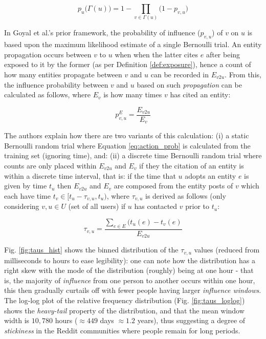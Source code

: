 \documentclass[journal,10pt,draftclsnofoot,onecolumn]{IEEEtran}
\begin{document}
\begin{equation}
\label{eq:joint_prob}
p_u\big(\Gamma(u)\big) = 1 - \displaystyle\prod_{v \in \Gamma(u)}\big(1 - p_{v,u}\big)
\end{equation}

In Goyal et al.'s prior framework, the probability of influence ($p_{v,u}$) of $v$ on $u$ is based upon the maximum likelihood estimate of a single Bernoulli trial.
An entity propagation occurs between $v$ to $u$ when when the latter cites $e$ after being exposed to it by the former (as per Definition \ref{def:exposure}), hence a count of how many entities propagate between $v$ and $u$ can be recorded in $E_{v2u}$.
From this, the influence probability between $v$ and $u$ based on such \emph{propagation} can be calculated as follows, where $E_v$ is how many times $v$ has cited an entity:

\begin{equation}
\label{eq:action_prob}
p^{E}_{v,u} = \frac{E_{v2u}}{E_v}
\end{equation}

The authors explain how there are two variants of this calculation: (i) a static Bernoulli random trial where Equation \ref{eq:action_prob} is calculated from the training set (ignoring time), and: (ii) a discrete time Bernoulli random trial where counts are only placed within $E_{v2u}$ and $E_v$ if they the citation of an entity is within a discrete time interval, that is: if the time that $u$ adopts an entity $e$ is given by time $t_u$ then $E_{v2u}$ and $E_v$ are composed from the entity posts of $v$ which each have time $t_v \in [t_u - \tau_{v,u}, t_u)$, where $\tau_{v,u}$ is derived as follows (only considering $v, u \in U$ (set of all users) if $u$ has contacted $v$ prior to $t_u$:

\begin{equation}
\tau_{v,u} = \frac{\displaystyle\sum_{e \in E} (t_u(e) - t_v(e)}{E_{v2u}}
\end{equation}

Fig. \ref{fig:taus_hist} shows the binned distribution of the $\tau_{v,u}$ values (reduced from milliseconds to hours to ease legibility): one can note how the distribution has a right skew with the mode of the distribution (roughly) being at one hour - that is, the majority of \emph{influence} from one person to another occurs within one hour, this then gradually curtails off with fewer people having larger \emph{influence windows}.
The log-log plot of the relative frequency distribution (Fig. \ref{fig:taus_loglog}) shows the \emph{heavy-tail} property of the distribution, and that the mean window width is $10,780$ hours ($\approx 449$ days $\approx 1.2$ years), thus suggesting a degree of \emph{stickiness} in the Reddit communities where people remain for long periods.
\end{document}
